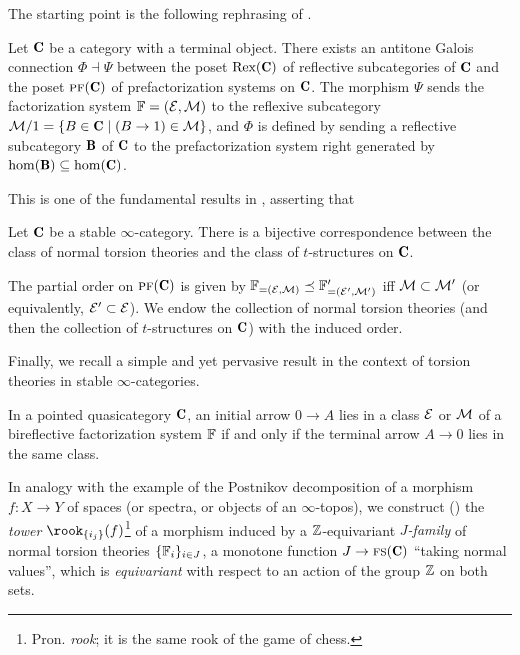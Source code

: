 \documentclass[a4paper,12pt]{amsart}
\renewcommand{\textbf}[1]{\text{\fontseries{b}\selectfont{\upshape #1}}}
\begin{document}
The starting point is the following rephrasing of \cite[Prop. \textbf{2.2}]{CHK}.
\begin{proposition*}
Let $\C$ be a category with a terminal object. There exists an antitone Galois connection $\Phi\dashv \Psi$ between the poset $\text{Rex}(\C)$ of reflective subcategories of $\C$ and the poset $\textsc{pf}(\C)$ of prefactorization systems on $\C$. The morphism $\Psi$ sends the factorization system $\mathbb{F}=(\mathcal{E},\mathcal{M})$ to the reflexive subcategory $\M/1 = \{B\in\C\mid (B\to 1)\in\M\}$, and $\Phi$ is defined  by sending  a reflective subcategory $\cate{B}$ of $\cate{C}$ to the prefactorization system right generated by $\hom(\cate B)\subseteq \hom(\C)$. 
\end{proposition*}
This is one of the fundamental results in \cite[Thm. \textbf{3.13}]{Fiorenza2014}, asserting that
\begin{theorem*}
Let $\C$ be a stable $\infty$-category. There is a bijective correspondence between the class of normal torsion theories and the class of $t$-structures on $\C$.
\end{theorem*}
\begin{remark*}
The partial order on $\textsc{pf}(\C)$ is given by $\mathbb{F}_{=(\mathcal{E},\mathcal{M})}\preceq \mathbb{F}'_{= (\mathcal{E}',\mathcal{M}')}$ iff $\mathcal{M}\subset\mathcal{M}'$ (or equivalently, $\mathcal{E}'\subset \mathcal{E}$). We endow the collection of normal torsion theories (and then the collection of $t$-structures on $\C$) with the induced order.
\end{remark*}
Finally, we recall a simple and yet pervasive result in the context of torsion theories in stable $\infty$-categories.
\begin{lemma*}
In a pointed quasicategory $\C$, an initial arrow $0\to A$ lies in a class $\mathcal{E}$ or $\mathcal{M}$ of a bireflective factorization system $\mathbb{F}$ if and only if the terminal arrow $A\to 0$ lies in the same class.
\end{lemma*}
In analogy with the example of the Postnikov decomposition of a morphism $f\colon X\to Y$ of spaces (or spectra, or objects of an $\infty$-topos), we construct (\adef {}) the \emph{tower} $\rook_{\{i_j\}}(f)$\footnote{Pron. \emph{rook}; it is the same rook of the game of chess.} of a morphism induced by a $\mathbb{Z}$-equivariant \emph{$J$-family} of normal torsion theories $\{\mathbb{F}_i\}_{i\in J}$, \ie a monotone function $J \to\fs(\C)$ ``taking normal values'', which is \emph{equivariant} with respect to an action of the group $\mathbb{Z}$ on both sets.
\end{document}
